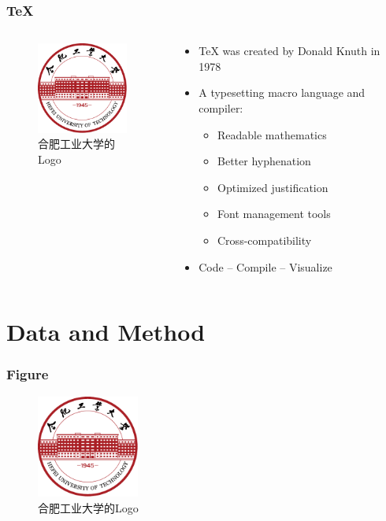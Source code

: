 \documentclass[aspectratio=169]{beamer}
\begin{document}
\begin{frame}
\frametitle{\TeX{}}
\begin{columns}
\begin{column}{5cm}
	\begin{figure}
		\centering
		\includegraphics[height=3cm]{images/HFUT_badge.pdf}
		\caption{合肥工业大学的Logo}
	\end{figure}
\end{column}
\begin{column}{6cm}
	\begin{itemize}
		\item \TeX{} was created by Donald Knuth in 1978
		\item A typesetting macro language and compiler:
		\begin{itemize}
			\item Readable mathematics
			\item Better hyphenation
			\item Optimized justification
			\item Font management tools
			\item Cross-compatibility
		\end{itemize}
		\item Code -- Compile -- Visualize
	\end{itemize}
\end{column}
\end{columns}
\end{frame}



\section{Data and Method}

\begin{frame}
\frametitle{Figure}
\vspace{-0.3cm}
\begin{figure}[h]
	\centering
	\includegraphics[width=0.3\textwidth]{images/HFUT_badge.pdf}
	\caption{合肥工业大学的Logo}
\end{figure}
\end{frame}
\end{document}
